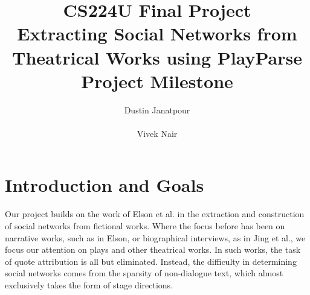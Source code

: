 \documentclass[10pt]{article}
\title{{\small CS224U Final Project} \\ Extracting Social Networks from Theatrical Works using PlayParse\\{\small Project Milestone}}
\author{Dustin Janatpour \\
  \\\And
  Vivek Nair  \\
}
\date{}
\begin{document}
\maketitle

\section{Introduction and Goals}
Our project builds on the work of Elson et al. in the extraction and construction of social networks from fictional works. Where the focus before has been on narrative works, such as in Elson, or biographical interviews, as in Jing et al., we focus our attention on plays and other theatrical works. In such works, the task of quote attribution is all but eliminated. Instead, the difficulty in determining social networks comes from the sparsity of non-dialogue text, which almost exclusively takes the form of stage directions.

{} 

\end{document}
